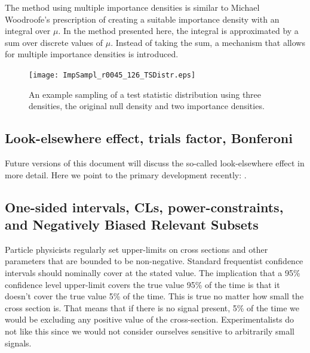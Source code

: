 \documentclass{cernrep}
\begin{document}
The method using multiple importance densities is similar to Michael Woodroofe's \cite{Woodroofe} prescription of creating a suitable importance density with an integral over $\mu$. In the method presented here, the integral is approximated by a sum over discrete values of $\mu$. Instead of taking the sum, a mechanism that allows for multiple importance densities is introduced.



\begin{figure}[htb]
  \begin{center}
    \texttt{[image: ImpSampl\_r0045\_126\_TSDistr.eps]}
  \end{center}
\vspace*{-0.5cm}
\caption{An example sampling of a test statistic distribution using three densities, the original null density and two importance densities.}
  \label{fig:ImpSampl}
\end{figure}

\subsection{Look-elsewhere effect, trials factor, Bonferoni}

Future versions of this document will discuss the so-called look-elsewhere effect in more detail.  Here we point to the primary development recently: \cite{LEE,ATL-PHYS-PUB-2011-011}.

\subsection{One-sided intervals, CLs, power-constraints, and Negatively Biased Relevant Subsets}

Particle physicists regularly set upper-limits on cross sections and other parameters that are bounded to be non-negative.  Standard frequentist confidence intervals should nominally cover at the stated value.  The implication that a 95\% confidence level upper-limit covers the true value 95\% of the time is that it doesn't cover the true value 5\% of the time.  This is true no matter how small the cross section is.  That means that if there is no signal present, 5\% of the time we would be excluding any positive value of the cross-section.  Experimentalists do not like this since we would not consider ourselves sensitive to arbitrarily small signals.  
\end{document}
